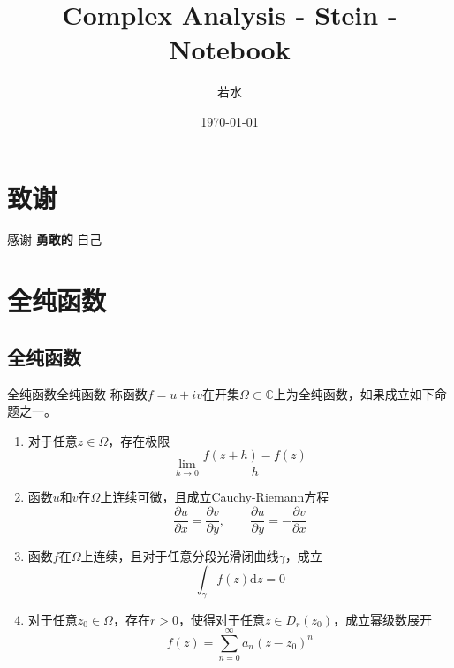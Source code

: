 \documentclass[lang = cn, scheme = chinese, thmcnt = section]{elegantbook}
\title{Complex Analysis - Stein - Notebook}                %
\author{若水}                        %
\date{\today}                       %
\newcommand{\C}{\mathbb{C}}  		   %
\newcommand{\sub}{\subset}             %
\begin{document}
\maketitle       %

\frontmatter     %

\chapter*{致谢}


\vspace*{\fill}
\begin{center}
	
	\large{感谢 \textbf{ 勇敢的 } 自己}
	
\end{center}
\vspace*{\fill}

\tableofcontents %

\mainmatter      %

\chapter{全纯函数}

\section{全纯函数}

\begin{definition}{全纯函数}{全纯函数}
	称函数$f=u+iv$在开集$\Omega\sub\C$上为全纯函数，如果成立如下命题之一。
	\begin{enumerate}
		\item 对于任意$z\in\Omega$，存在极限%
		$$
		\lim_{h\to 0}\frac{f(z+h)-f(z)}{h}
		$$
		\item 函数$u$和$v$在$\Omega$​上连续可微，且成立Cauchy-Riemann方程
		$$
		\frac{\partial u}{\partial x}=\frac{\partial v}{\partial y},
		\qquad
		\frac{\partial u}{\partial y}=-\frac{\partial v}{\partial x}
		$$
		\item 函数$f$在$\Omega$上连续，且对于任意分段光滑闭曲线$\gamma$，成立%
		$$
		\int_\gamma{f(z)\mathrm{d}z}=0
		$$
		\item 对于任意$z_0\in \Omega$，存在$r>0$，使得对于任意$z\in D_r(z_0)$，成立幂级数展开
		$$
		f(z)=\sum_{n=0}^{\infty}{a_n(z-z_0)^n}
		$$
	\end{enumerate}
\end{definition}
\end{document}
